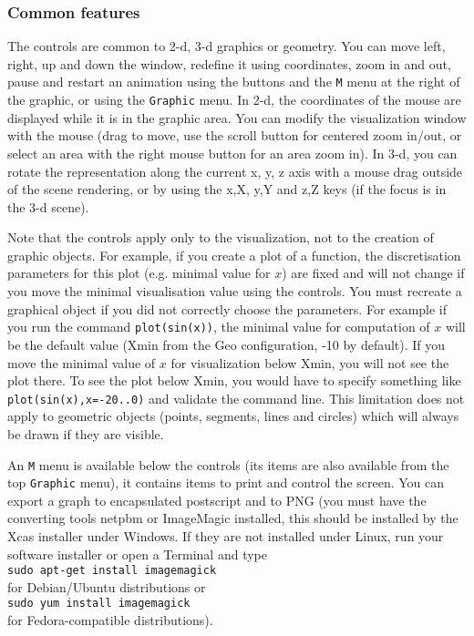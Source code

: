\documentclass{article}
\begin{document}
\subsubsection{Common features}
The controls are common to 2-d, 3-d graphics or geometry. You can
move left, right, up and down the window, redefine it using
coordinates, zoom in and out, pause and restart an animation using the
buttons and the {\tt M} menu at the right of the graphic, or 
using the {\tt Graphic} menu.
In 2-d, the coordinates 
of the mouse are displayed while it is in the graphic area. 
You can modify the visualization
window with the mouse (drag to move, 
use the scroll button for centered zoom in/out, or select an area with
the right mouse button for an area zoom in).
In 3-d,
you can rotate the representation along the current x, y, z axis
with a mouse drag outside of the scene rendering, or
by using the x,X, y,Y and z,Z keys (if the focus is in the 3-d scene).

Note that the controls apply only to the visualization, not to the creation
of graphic objects. For example, if you create a plot of a function,
the discretisation parameters for this plot (e.g. minimal value for
$x$) are fixed and will not change if you move the minimal visualisation
value using the controls. You must recreate a graphical object if
you did not correctly choose the parameters. For example if you
run the command \verb|plot(sin(x))|, the minimal value for computation
of $x$ will be the default value 
(Xmin from the Geo configuration, -10 by default). If
you move the minimal value of $x$ for visualization below Xmin, you will
not see the plot there. To see the plot below Xmin, you would have
to specify something like \verb|plot(sin(x),x=-20..0)| and validate
the command line. This limitation does not apply to geometric objects
(points, segments, lines and circles) 
which will always be drawn if they are visible.

An {\tt M} menu is available below the controls (its items are also available
from the top {\tt Graphic} menu), 
it contains items to print
and control the screen. You can export a graph to encapsulated
postscript and to PNG (you must have the converting tools 
netpbm or ImageMagic
installed, this should be installed by the Xcas installer under Windows. If they
are not installed under Linux, run your software installer or 
open a Terminal
and type \\
\verb|sudo apt-get install imagemagick| \\
for Debian/Ubuntu distributions or\\
\verb|sudo yum install imagemagick| \\
for Fedora-compatible distributions).
\end{document}

